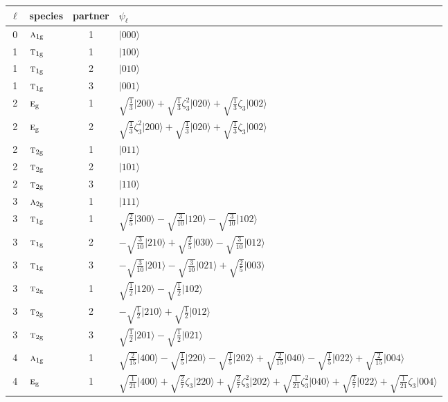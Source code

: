 \documentclass[11pt]{article}
\newcommand{\irr}[1]{\text{\normalfont\scshape #1}}
\newcommand{\ptag}[1]{\mathrm{#1}}
\newcommand{\rootunity}[1]{\zeta_{#1}}
\newcommand{\occ}[1]{\lvert #1\rangle}
\begin{document}
\begin{longtable}{c l c p{}}\hline $\ell$ & species & partner & $\psi_\ell$\\ \hline\endhead
0 & $\irr{a}_{1\ptag{g}}$ & 1 & $\occ{000}$\\
\hline
1 & $\irr{t}_{1\ptag{g}}$ & 1 & $\occ{100}$\\
1 & $\irr{t}_{1\ptag{g}}$ & 2 & $\occ{010}$\\
1 & $\irr{t}_{1\ptag{g}}$ & 3 & $\occ{001}$\\
\hline
2 & $\irr{e}_{\ptag{g}}$ & 1 & $\sqrt{\tfrac{1}{3}}\occ{200}+\sqrt{\tfrac{1}{3}}\rootunity{3}^{2}\occ{020}+\sqrt{\tfrac{1}{3}}\rootunity{3}\occ{002}$\\
2 & $\irr{e}_{\ptag{g}}$ & 2 & $\sqrt{\tfrac{1}{3}}\rootunity{3}^{2}\occ{200}+\sqrt{\tfrac{1}{3}}\occ{020}+\sqrt{\tfrac{1}{3}}\rootunity{3}\occ{002}$\\
2 & $\irr{t}_{2\ptag{g}}$ & 1 & $\occ{011}$\\
2 & $\irr{t}_{2\ptag{g}}$ & 2 & $\occ{101}$\\
2 & $\irr{t}_{2\ptag{g}}$ & 3 & $\occ{110}$\\
\hline
3 & $\irr{a}_{2\ptag{g}}$ & 1 & $\occ{111}$\\
3 & $\irr{t}_{1\ptag{g}}$ & 1 & $\sqrt{\tfrac{2}{5}}\occ{300}-\sqrt{\tfrac{3}{10}}\occ{120}-\sqrt{\tfrac{3}{10}}\occ{102}$\\
3 & $\irr{t}_{1\ptag{g}}$ & 2 & $-\sqrt{\tfrac{3}{10}}\occ{210}+\sqrt{\tfrac{2}{5}}\occ{030}-\sqrt{\tfrac{3}{10}}\occ{012}$\\
3 & $\irr{t}_{1\ptag{g}}$ & 3 & $-\sqrt{\tfrac{3}{10}}\occ{201}-\sqrt{\tfrac{3}{10}}\occ{021}+\sqrt{\tfrac{2}{5}}\occ{003}$\\
3 & $\irr{t}_{2\ptag{g}}$ & 1 & $\sqrt{\tfrac{1}{2}}\occ{120}-\sqrt{\tfrac{1}{2}}\occ{102}$\\
3 & $\irr{t}_{2\ptag{g}}$ & 2 & $-\sqrt{\tfrac{1}{2}}\occ{210}+\sqrt{\tfrac{1}{2}}\occ{012}$\\
3 & $\irr{t}_{2\ptag{g}}$ & 3 & $\sqrt{\tfrac{1}{2}}\occ{201}-\sqrt{\tfrac{1}{2}}\occ{021}$\\
\hline
4 & $\irr{a}_{1\ptag{g}}$ & 1 & $\sqrt{\tfrac{2}{15}}\occ{400}-\sqrt{\tfrac{1}{5}}\occ{220}-\sqrt{\tfrac{1}{5}}\occ{202}+\sqrt{\tfrac{2}{15}}\occ{040}-\sqrt{\tfrac{1}{5}}\occ{022}+\sqrt{\tfrac{2}{15}}\occ{004}$\\
4 & $\irr{e}_{\ptag{g}}$ & 1 & $\sqrt{\tfrac{1}{21}}\occ{400}+\sqrt{\tfrac{2}{7}}\rootunity{3}\occ{220}+\sqrt{\tfrac{2}{7}}\rootunity{3}^{2}\occ{202}+\sqrt{\tfrac{1}{21}}\rootunity{3}^{2}\occ{040}+\sqrt{\tfrac{2}{7}}\occ{022}+\sqrt{\tfrac{1}{21}}\rootunity{3}\occ{004}$\\

\end{longtable}
\end{document}
